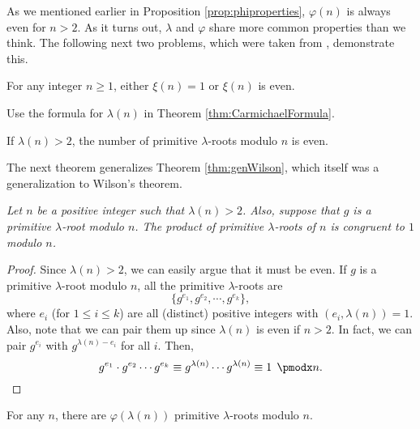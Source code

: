\documentclass{subfile}
\begin{document}
	As we mentioned earlier in Proposition \ref{prop:phiproperties}, $\varphi(n)$ is always even for $n>2$. As it turns out, $\lambda$ and $\varphi$ share more common properties than we think. The following next two problems, which were taken from \cite{ch:congruence-primitive-lambda}, demonstrate this.
	
	\begin{problem}
		For any integer $n\geq 1$, either $\xi(n)=1$ or $\xi(n)$ is even.
	\end{problem}

	\begin{hint}
		Use the formula for $\lambda(n)$ in Theorem \ref{thm:CarmichaelFormula}.
	\end{hint}

	\begin{problem}
		If $\lambda(n)>2$, the number of primitive $\lambda$-roots modulo $n$ is even.
	\end{problem}

	

	The next theorem generalizes Theorem \ref{thm:genWilson}, which itself was a generalization to Wilson's theorem. 
	\begin{theorem}\slshape
		Let $n$ be a positive integer such that $\lambda(n)>2$. Also, suppose that $g$ is a primitive $\lambda$-root modulo $n$. The product of primitive $\lambda$-roots of $n$ is congruent to $1$ modulo $n$.
	\end{theorem}
	
	\begin{proof}
		Since $\lambda(n)>2$, we can easily argue that it must be even. If $g$ is a primitive $\lambda$-root modulo $n$, all the primitive $\lambda$-roots are $$\{g^{e_1}, g^{e_2}, \cdots, g^{e_{k}}\},$$ where $e_i$ (for $1 \leq i \leq k$) are all (distinct) positive integers with $(e_i, \lambda(n))=1$. Also, note that we can pair them up since $\lambda(n)$ is even if $n>2$. In fact, we can pair $g^{e_i}$ with $g^{\lambda(n)-e_i}$ for all $i$. Then,
		\begin{equation*}
		g^{e_1}\cdot g^{e_2}\cdots g^{e_k}  \equiv g^{\lambda(n)}\cdots g^{\lambda(n)}  \equiv 1\pmod n. \qedhere
		\end{equation*}
	\end{proof}
	
	\begin{corollary}
		For any $n$, there are $\varphi(\lambda(n))$ primitive $\lambda$-roots modulo $n$.
	\end{corollary}
	
\end{document}
